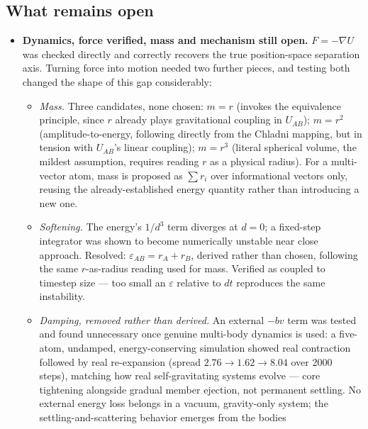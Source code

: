 \documentclass[12pt, a4paper]{article}
\begin{document}
\subsection{What remains open}
\label{subsec:assembly_open}
\begin{itemize}
\item \textbf{Dynamics, force verified, mass and mechanism still
      open.} $F=-\nabla U$ was checked directly and correctly
      recovers the true position-space separation axis. Turning
      force into motion needed two further pieces, and testing both
      changed the shape of this gap considerably:
      \begin{itemize}
      \item \emph{Mass.} Three candidates, none chosen: $m=r$
            (invokes the equivalence principle, since $r$ already
            plays gravitational coupling in $U_{AB}$); $m=r^2$
            (amplitude-to-energy, following directly from the
            Chladni mapping, but in tension with $U_{AB}$'s linear
            coupling); $m=r^3$ (literal spherical volume, the
            mildest assumption, requires reading $r$ as a physical
            radius). For a multi-vector atom, mass is proposed as
            $\sum r_i$ over informational vectors only, reusing the
            already-established energy quantity rather than
            introducing a new one.
      \item \emph{Softening.} The energy's $1/d^3$ term diverges at
            $d=0$; a fixed-step integrator was shown to become
            numerically unstable near close approach. Resolved:
            $\varepsilon_{AB}=r_A+r_B$, derived rather than chosen,
            following the same $r$-as-radius reading used for mass.
            Verified as coupled to timestep size --- too small an
            $\varepsilon$ relative to $dt$ reproduces the same
            instability.
      \item \emph{Damping, removed rather than derived.} An external
            $-bv$ term was tested and found unnecessary once genuine
            multi-body dynamics is used: a five-atom, undamped,
            energy-conserving simulation showed real contraction
            followed by real re-expansion (spread $2.76\to1.62\to
            8.04$ over 2000 steps), matching how real self-gravitating
            systems evolve --- core tightening alongside gradual
            member ejection, not permanent settling. No external
            energy loss belongs in a vacuum, gravity-only system; the
            settling-and-scattering behavior emerges from the bodies

\end{itemize}
\end{itemize}
\end{document}
